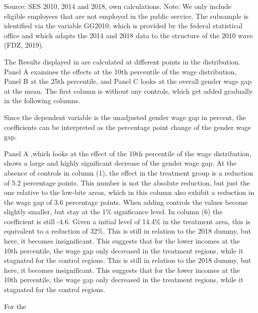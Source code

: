 \documentclass[12pt,draft,a4paper]{article}
\begin{document}
\begin{table}[btp]
{    }
    Source: SES 2010, 2014 and 2018, own calculations. Note: We only include eligible employees that are not employed in the public service. The subsample is identiﬁed via the variable GG2010, which is provided by the federal statistical oﬃce and which adapts the 2014 and 2018 data to the structure of the 2010 wave (FDZ, 2019).
    \label{tab:main}
    \end{table}



The Results displayed in  are calculated at different points in the distribution. Panel A examines the effects at the 10th percentile of the wage distribution, Panel B at the 25th percentile, and Panel C looks at the overall gender wage gap at the mean. The first column is without any controls, which get added gradually in the following columns.  

Since the dependent variable is the unadjusted gender wage gap in percent, the coefficients can be interpreted as  the percentage point change of the gender wage gap.

Panel A ,which looks at the effect of the 10th percentile of the wage distribution, shows a large and highly significant decrease of the gender wage gap. 
At the absence of controls in column (1), the effect in the treatment group is a reduction of 5.2 percentage points. This number is not the absolute reduction, but just the one relative to the low-bite areas, which in this column also exhibit a reduction in the wage gap of 3.6 percentage points.
When adding controls the values become slightly smaller, but stay at the 1\% significance level. In column (6) the coefficient is still -4.6. Given a initial level of 14.4\% in the treatment area, this is equivalent to a reduction of 32\%.
This is still in relation to the 2018 dummy, but here, it becomes insignificant. This suggests that for the lower incomes at the 10th percentile, the wage gap only decreased in the treatment regions, while it stagnated for the control regions.
This is still in relation to the 2018 dummy, but here, it becomes insignificant. This suggests that for the lower incomes at the 10th percentile, the wage gap only decreased in the treatment regions, while it stagnated for the control regions.

For the 
\end{document}
